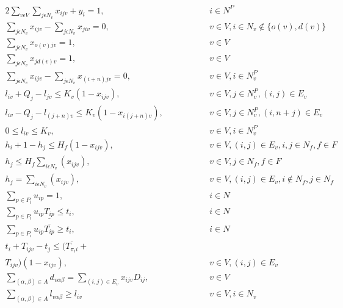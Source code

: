 \documentclass[a4paper,10pt]{article}
\begin{document}
\begin{alignat} {2}
    	\sum_{v\epsilon V}\sum_{j\epsilon N_v}x_{ijv} + y_i = 1,		&\quad\quad\quad&& 	 i \in N^P 				\label{eq:2} 	\\[4pt]
    	\sum_{j\epsilon N_v}x_{ijv} - \sum_{j\epsilon N_v}x_{jiv} = 0,		& 	&&	v \in V, i\in N_v \notin \{o(v), d(v)\}		\label{eq:3} 	\\[4pt]
    	\sum_{j\epsilon N_v}x_{o(v)jv} = 1,					& 	&&	v \in V 					\label{eq:4}	\\[4pt]
    	\sum_{j\epsilon N_v}x_{j d(v)v} = 1,					& 	&&	v \in V 					\label{eq:5}	\\[4pt]
    	\sum_{j\epsilon N_v}x_{ijv} - \sum_{j\epsilon N_v}x_{(i+n)jv} = 0,	& 	&&	v \in V, i\in N^P_v 				\label{eq:6}	\\[4pt]
    	l_{iv} + Q_j - l_{jv} \leq K_v(1-x_{ijv}),				& 	&&	v \in V, j\in N_v^P, (i,j) \in E_v 		\label{eq:7} 	\\[8pt]
    	l_{iv} - Q_j - l_{(j+n)v} \leq K_v(1-x_{i(j+n)v}),			& 	&&	v \in V ,j\in N_v^P, (i, n+j)\in E_v 		\label{eq:8}	\\[8pt]
    	0 \leq l_{iv} \leq K_v,							& 	&&	v \in V, i \in N^P_v 				\label{eq:9}	\\[8pt]
    	h_{i} + 1 - h_{j} \leq H_f(1-x_{ijv}),					& 	&&	v \in V, (i,j)\in E_v,  i, j \in N_f, f\in F 	\label{eq:10}	\\[4pt]
    	h_{j} \leq H_f\sum_{i\epsilon N_v}(x_{ijv}),				& 	&&	v \in V, j\in N_f, f\in F 			\label{eq:11}	\\[4pt]
    	h_{j} = \sum_{i\epsilon N_v}(x_{ijv}),					& 	&&	v \in V, (i, j)\in E_v, i \notin N_f, j \in N_f	\label{eq:12}	\\[4pt]
    	\sum_{p\in P_i} u_{ip} = 1,						& 	&& 	i \in N 					\label{eq:13}	\\[4pt]
    	\sum_{p\in P_i} u_{ip}\underline{T_{ip}} \leq t_{i},			& 	&&	i \in N 					\label{eq:14}	\\[4pt]
    	\sum_{p\in P_i} u_{ip}\overline{T_{ip}} \geq t_{i},			& 	&& 	i \in N 					\label{eq:15}	\\[4pt]
    	t_{i} + T_{ijv} - t_{j} \leq (\overline{T_{\pi_i i}} + 			& 	&&						\nonumber\\
    	T_{ijv})(1 - x_{ijv}),							& 	&& 	v \in V, (i,j) \in E_v				\label{eq:16}	\\[8pt]
    	\sum_{(\alpha,\beta) \in A}d_{v\alpha\beta} = 
    	\sum_{(i,j) \in E_v} x_{ijv}D_{ij},					& 	&&	v \in V						\label{eq:17}	\\[4pt]
	\sum_{(\alpha,\beta) \in A} l_{v\alpha\beta} \geq l_{iv}		&	&& 	v \in V, i \in N_v				\label{eq:18}	\\[4pt]

\end{alignat}
\end{document}
